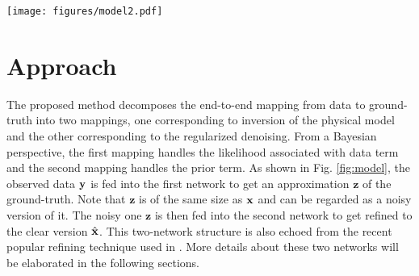 \documentclass[10pt,twocolumn,letterpaper]{article}
\begin{document}
\begin{figure*}
\centering 
\texttt{[image: figures/model2.pdf]}
\caption{The pipeline architecture of \emph{InverseNet}. Initially, the degraded input $\mathbf{y}$ is pre-processed by bicubic resizing depending on the task, e.g., for super-resolution. Thus, the input $\mathbf{y}$ of U-Nets has the same size as the output $\mathbf{z}$. Next, the output $\mathbf{z}$ is fed into the DAEs with two pixel shuffling blocks. In the end, the intermediate result $\mathbf{z}$ and final estimation $\hat{\mathbf{x}}$ are both fed into the discriminator and \emph{comparator} with the ground-truth.}
\label{fig:model}
\end{figure*}

\section{Approach}
The proposed method decomposes the end-to-end mapping from data to ground-truth into two mappings,
one corresponding to inversion of the physical model and the other corresponding to the regularized denoising. 
From a Bayesian perspective, the first mapping handles the likelihood associated with data term 
and the second mapping handles the prior term. 
As shown in Fig. \ref{fig:model}, the observed data ${\mathbf{y}}$ is fed into the first network to 
get an approximation $\mathbf{z}$ of the ground-truth. 
Note that $\mathbf{z}$ is of the same size as ${\mathbf{x}}$ and can be regarded as a noisy version of it. 
The noisy one $\mathbf{z}$ is then fed into the second network to get refined to the clear version $\hat{{\mathbf{x}}}$. 
This two-network structure is also echoed from the recent popular refining technique used in \cite{shankar2016refining,chen2017photographic}.
More details about these two networks will be elaborated in the following sections.
\end{document}
